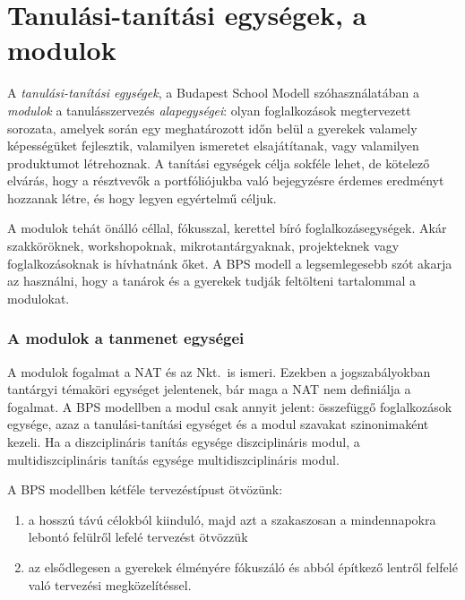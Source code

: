 \hypertarget{tanulasi-tanitasi-egysegek-a-modulok}{%
\section{Tanulási-tanítási egységek, a
modulok}\label{tanulasi-tanitasi-egysegek-a-modulok}}

A \emph{tanulási-tanítási egységek}, a Budapest School Modell
szóhasználatában a \emph{modulok} a tanulásszervezés
\emph{alapegységei}: olyan foglalkozások megtervezett sorozata, amelyek
során egy meghatározott időn belül a gyerekek valamely képességüket
fejlesztik, valamilyen ismeretet elsajátítanak, vagy valamilyen
produktumot létrehoznak. A tanítási egységek célja sokféle lehet, de
kötelező elvárás, hogy a résztvevők a portfóliójukba való bejegyzésre érdemes
eredményt hozzanak létre, és hogy legyen egyértelmű céljuk.

A modulok tehát önálló céllal, fókusszal, kerettel bíró
foglalkozásegységek. Akár szakköröknek, workshopoknak,
mikrotantárgyaknak, projekteknek vagy foglalkozásoknak is hívhatnánk őket. A BPS modell a
legsemlegesebb szót akarja az használni, hogy a tanárok és a gyerekek
tudják feltölteni tartalommal a modulokat.

\hypertarget{a-modulok-a-tanmenet-egysegei}{%
\subsubsection{A modulok a tanmenet
egységei}\label{a-modulok-a-tanmenet-egysegei}}

A modulok fogalmat a NAT és az Nkt.\ is ismeri. Ezekben a jogszabályokban
tantárgyi témaköri egységet jelentenek, bár maga a NAT nem definiálja a
fogalmat. A BPS modellben a modul csak annyit jelent: összefüggő
foglalkozások egysége, azaz a tanulási-tanítási egységet és a modul
szavakat szinonimaként kezeli. Ha a diszciplináris tanítás egysége
diszciplináris modul, a multidiszciplináris tanítás egysége
multidiszciplináris modul.

A BPS modellben kétféle tervezéstípust ötvözünk:

\begin{enumerate}
\def\labelenumi{\arabic{enumi}.}
\tightlist
\item
  a hosszú távú célokból kiinduló, majd azt a szakaszosan a mindennapokra
  lebontó felülről lefelé tervezést ötvözzük
\item
  az elsődlegesen a gyerekek élményére fókuszáló és abból építkező
  lentről felfelé való tervezési megközelítéssel.
\end{enumerate}

